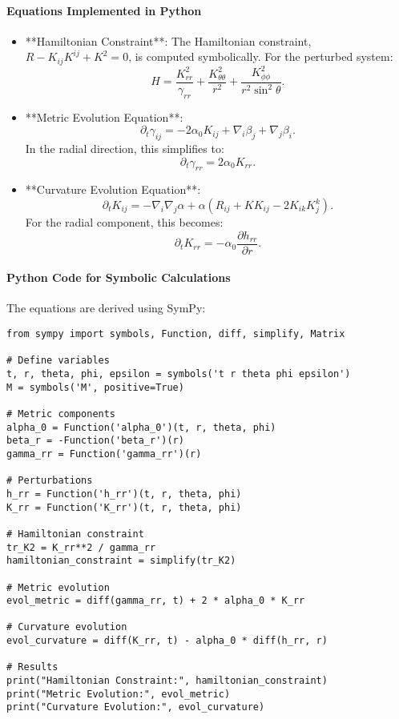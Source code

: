 \documentclass[12pt]{article}
\begin{document}
\paragraph{Equations Implemented in Python}
\begin{itemize}
    \item **Hamiltonian Constraint**: The Hamiltonian constraint, $R - K_{ij}K^{ij} + K^2 = 0$, is computed symbolically. For the perturbed system:
    \[
    H = \frac{K_{rr}^2}{\gamma_{rr}} + \frac{K_{\theta\theta}^2}{r^2} + \frac{K_{\phi\phi}^2}{r^2 \sin^2\theta}.
    \]
    \item **Metric Evolution Equation**:
    \[
    \partial_t \gamma_{ij} = -2\alpha_0 K_{ij} + \nabla_i \beta_j + \nabla_j \beta_i.
    \]
    In the radial direction, this simplifies to:
    \[
    \partial_t \gamma_{rr} = 2\alpha_0 K_{rr}.
    \]
    \item **Curvature Evolution Equation**:
    \[
    \partial_t K_{ij} = -\nabla_i \nabla_j \alpha + \alpha (R_{ij} + K K_{ij} - 2K_{ik}K^k_j).
    \]
    For the radial component, this becomes:
    \[
    \partial_t K_{rr} = -\alpha_0 \frac{\partial h_{rr}}{\partial r}.
    \]
\end{itemize}

\paragraph{Python Code for Symbolic Calculations}
The equations are derived using SymPy:
\begin{verbatim}
from sympy import symbols, Function, diff, simplify, Matrix

# Define variables
t, r, theta, phi, epsilon = symbols('t r theta phi epsilon')
M = symbols('M', positive=True)

# Metric components
alpha_0 = Function('alpha_0')(t, r, theta, phi)
beta_r = -Function('beta_r')(r)
gamma_rr = Function('gamma_rr')(r)

# Perturbations
h_rr = Function('h_rr')(t, r, theta, phi)
K_rr = Function('K_rr')(t, r, theta, phi)

# Hamiltonian constraint
tr_K2 = K_rr**2 / gamma_rr
hamiltonian_constraint = simplify(tr_K2)

# Metric evolution
evol_metric = diff(gamma_rr, t) + 2 * alpha_0 * K_rr

# Curvature evolution
evol_curvature = diff(K_rr, t) - alpha_0 * diff(h_rr, r)

# Results
print("Hamiltonian Constraint:", hamiltonian_constraint)
print("Metric Evolution:", evol_metric)
print("Curvature Evolution:", evol_curvature)
\end{verbatim}
\end{document}
